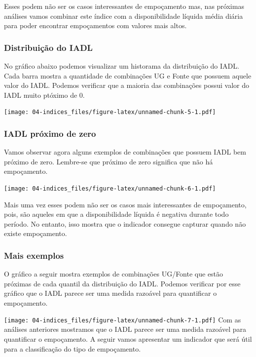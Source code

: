 \documentclass[
]{book}
\begin{document}
Esses podem não ser os casos interessantes de empoçamento mas, nas próximas análises vamos combinar este índice com a disponibilidade líquida média diária para poder encontrar empoçamentos com valores mais altos.

\hypertarget{distribuiuxe7uxe3o-do-iadl}{%
\subsubsection{Distribuição do IADL}\label{distribuiuxe7uxe3o-do-iadl}}

No gráfico abaixo podemos visualizar um historama da distribuição do IADL.
Cada barra mostra a quantidade de combinações UG e Fonte que possuem aquele valor do IADL.
Podemos verificar que a maioria das combinações possui valor do IADL muito ptóximo de 0.

\texttt{[image: 04-indices\_files/figure-latex/unnamed-chunk-5-1.pdf]}

\hypertarget{iadl-pruxf3ximo-de-zero}{%
\subsubsection{IADL próximo de zero}\label{iadl-pruxf3ximo-de-zero}}

Vamos observar agora alguns exemplos de combinações que possuem IADL bem próximo de zero.
Lembre-se que próximo de zero significa que não há empoçamento.

\texttt{[image: 04-indices\_files/figure-latex/unnamed-chunk-6-1.pdf]}

Mais uma vez esses podem não ser os casos mais interessantes de empoçamento, pois, são aqueles em que a disponibilidade líquida é negativa durante todo período. No entanto, isso mostra que o indicador consegue capturar quando não existe empoçamento.

\hypertarget{mais-exemplos}{%
\subsubsection{Mais exemplos}\label{mais-exemplos}}

O gráfico a seguir mostra exemplos de combinações UG/Fonte que estão próximas
de cada quantil da distribuição do IADL. Podemos verificar por esse gráfico que o IADL parece ser uma medida razoável para quantificar o empoçamento.

\texttt{[image: 04-indices\_files/figure-latex/unnamed-chunk-7-1.pdf]}
Com as análises anteriores mostramos que o IADL parece ser uma medida razoável para quantificar o empoçamento. A seguir vamos apresentar um indicador que será útil para a classificação do tipo de empoçamento.
\end{document}
